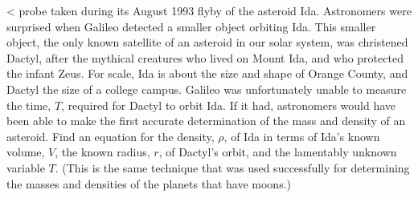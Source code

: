 <%
probe taken during its August 1993 flyby of the asteroid
Ida. Astronomers were surprised when Galileo detected a
smaller object orbiting Ida. This smaller object, the only
known satellite of an asteroid in our solar system, was
christened Dactyl, after the mythical creatures who lived on
Mount Ida, and who protected the infant Zeus. For scale, Ida
is about the size and shape of Orange County, and Dactyl the
size of a college campus. Galileo was unfortunately unable
to measure the time, $T$, required for Dactyl to orbit Ida.
If it had, astronomers would have been able to make the
first accurate determination of the mass and density of an
asteroid. Find an equation for the density, $\rho $, of Ida
in terms of Ida's known volume, $V$, the known radius, $r$,
of Dactyl's orbit, and the lamentably unknown variable $T$.
(This is the same technique that was used successfully for
determining the masses and densities of the planets that have moons.)
